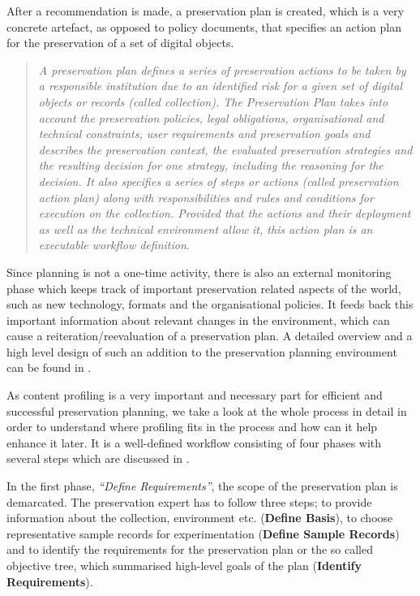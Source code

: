 After a recommendation is made, a preservation plan is created, which is a very concrete artefact, as opposed to policy documents, that specifies an action plan for the preservation of a set of digital objects.

\begin{quote}
\textit{A preservation plan defines a series of preservation actions to be taken by a responsible institution due to an identified risk for a given set of digital objects or records (called collection). The Preservation Plan takes into account the preservation policies, legal obligations, organisational and technical constraints, user requirements and preservation goals and describes the preservation context, the evaluated preservation strategies and the resulting decision for one strategy, including the reasoning for the decision. It also specifies a series of steps or actions (called preservation action plan) along with responsibilities and rules and conditions for execution on the collection. Provided that the actions and their deployment as well as the technical environment allow it, this action plan is an executable workflow definition}\cite{Becker:2009fk}.
\end{quote}

Since planning is not a one-time activity, there is also an external monitoring phase which keeps track of important preservation related aspects of the world, such as new technology, formats and the organisational policies. It feeds back this important information about relevant changes in the environment, which can cause a reiteration/reevaluation of a preservation plan. A detailed overview and a high level design of such an addition to the preservation planning environment can be found in \cite{duretec:2012:watch}.

As content profiling is a very important and necessary part for efficient and successful preservation planning, we take a look at the whole process in detail in order to understand where profiling fits in the process and how can it help enhance it later. It is a well-defined workflow consisting of four phases with several steps which are discussed in \cite{STR07_jcdl}.

In the first phase, \textit{``Define Requirements''}, the scope of the preservation plan is demarcated. The preservation expert has to follow three steps; to provide information about the collection, environment etc. (\textbf{Define Basis}), to choose representative sample records for experimentation (\textbf{Define Sample Records}) and to identify the requirements for the preservation plan or the so called objective tree, which summarised high-level goals of the plan (\textbf{Identify Requirements}). 

